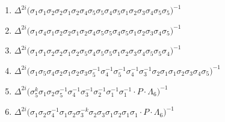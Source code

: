 \vspace{0.3cm}
\begingroup
\raggedbottom
\begin{enumerate}
    \item $\displaystyle \Delta^{2i} \big( \allowbreak\sigma_{1}\allowbreak\sigma_{1}\allowbreak\sigma_{2}\allowbreak\sigma_{2}\allowbreak\sigma_{1}\allowbreak\sigma_{2}\allowbreak\sigma_{4}\allowbreak\sigma_{5}\allowbreak\sigma_{5}\allowbreak\sigma_{4}\allowbreak\sigma_{5}\allowbreak\sigma_{1}\allowbreak\sigma_{2}\allowbreak\sigma_{3}\allowbreak\sigma_{4}\allowbreak\sigma_{5}\allowbreak\sigma_{5} \big)^{-1}$
    \item $\displaystyle \Delta^{2i} \big( \allowbreak\sigma_{1}\allowbreak\sigma_{4}\allowbreak\sigma_{1}\allowbreak\sigma_{2}\allowbreak\sigma_{2}\allowbreak\sigma_{1}\allowbreak\sigma_{2}\allowbreak\sigma_{4}\allowbreak\sigma_{5}\allowbreak\sigma_{5}\allowbreak\sigma_{4}\allowbreak\sigma_{5}\allowbreak\sigma_{1}\allowbreak\sigma_{2}\allowbreak\sigma_{3}\allowbreak\sigma_{4}\allowbreak\sigma_{5} \big)^{-1}$
    \item $\displaystyle \Delta^{2i} \big( \allowbreak\sigma_{1}\allowbreak\sigma_{1}\allowbreak\sigma_{2}\allowbreak\sigma_{2}\allowbreak\sigma_{1}\allowbreak\sigma_{2}\allowbreak\sigma_{5}\allowbreak\sigma_{4}\allowbreak\sigma_{5}\allowbreak\sigma_{5}\allowbreak\sigma_{1}\allowbreak\sigma_{2}\allowbreak\sigma_{3}\allowbreak\sigma_{4}\allowbreak\sigma_{5}\allowbreak\sigma_{5}\allowbreak\sigma_{4} \big)^{-1}$
    \item $\displaystyle \Delta^{2i} \big( \allowbreak\sigma_{1}\allowbreak\sigma_{5}\allowbreak\sigma_{4}\allowbreak\sigma_{2}\allowbreak\sigma_{1}\allowbreak\sigma_{2}\allowbreak\sigma_{3}\allowbreak\sigma_{5}^{-1}\allowbreak\sigma_{4}^{-1}\allowbreak\sigma_{5}^{-1}\allowbreak\sigma_{4}^{-1}\allowbreak\sigma_{3}^{-1}\allowbreak\sigma_{2}\allowbreak\sigma_{1}\allowbreak\sigma_{1}\allowbreak\sigma_{2}\allowbreak\sigma_{3}\allowbreak\sigma_{4}\allowbreak\sigma_{5} \big)^{-1}$
    \item $\displaystyle \Delta^{2i} \big( \allowbreak\sigma_{5}^k\allowbreak\sigma_{1}\allowbreak\sigma_{2}\allowbreak\sigma_{5}^{-1}\allowbreak\sigma_{4}^{-1}\allowbreak\sigma_{3}^{-1}\allowbreak\sigma_{2}^{-1}\allowbreak\sigma_{1}^{-1}\allowbreak\sigma_{1}^{-1} \cdot P \cdot \Lambda_6 \big)^{-1}$
    \item $\displaystyle \Delta^{2i} \big( \allowbreak\sigma_{1}\allowbreak\sigma_{2}\allowbreak\sigma_{4}^{-1}\allowbreak\sigma_{1}\allowbreak\sigma_{2}\allowbreak\sigma_{3}^{-k}\allowbreak\sigma_{2}\allowbreak\sigma_{3}\allowbreak\sigma_{1}\allowbreak\sigma_{2}\allowbreak\sigma_{1}\allowbreak\sigma_{1} \cdot P \cdot \Lambda_6 \big)^{-1}$
\end{enumerate}
\endgroup

